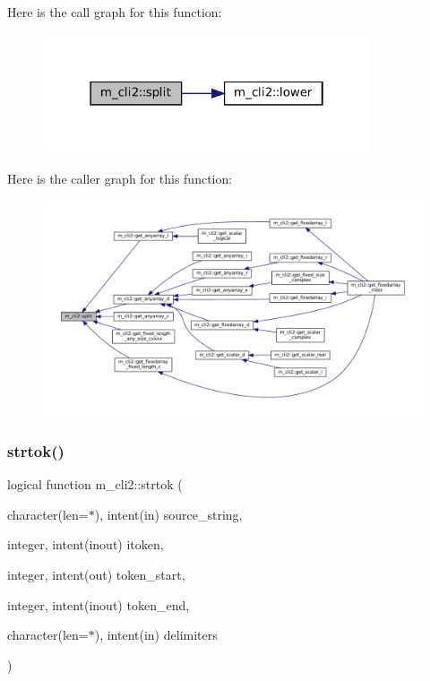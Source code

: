 Here is the call graph for this function\+:
\nopagebreak
\begin{figure}[H]
\begin{center}
\leavevmode
\includegraphics[width=274pt]{namespacem__cli2_a6578e29ee4dc56651528e7e0acd29665_cgraph}
\end{center}
\end{figure}
Here is the caller graph for this function\+:
\nopagebreak
\begin{figure}[H]
\begin{center}
\leavevmode
\includegraphics[width=350pt]{namespacem__cli2_a6578e29ee4dc56651528e7e0acd29665_icgraph}
\end{center}
\end{figure}
\mbox{\label{namespacem__cli2_a752fd074abce57e636e4572b3e55db3a}} 
\subsubsection{\texorpdfstring{strtok()}{strtok()}}
{\footnotesize\ttfamily logical function m\+\_\+cli2\+::strtok (\begin{DoxyParamCaption}\item[{character(len=$\ast$), intent(in)}]{source\+\_\+string,  }\item[{integer, intent(inout)}]{itoken,  }\item[{integer, intent(out)}]{token\+\_\+start,  }\item[{integer, intent(inout)}]{token\+\_\+end,  }\item[{character(len=$\ast$), intent(in)}]{delimiters }\end{DoxyParamCaption})\hspace{0.3cm}{\ttfamily [private]}}

